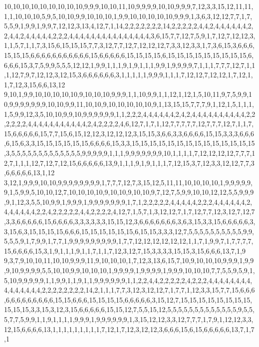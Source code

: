 10,10,10,10,10,10,10,10,10,9,9,9,10,10,11,10,9,9,9,9,10,10,9,9,9,7,12,3,3,15,12,11,11,1,1,10,10,10,5,9,5,10,10,9,9,10,10,10,1,9,9,10,10,10,10,10,9,9,9,1,3,6,3,12,12,7,7,1,7,5,5,9,1,9,9,1,9,9,7,12,12,3,13,4,12,7,1,14,2,2,2,2,2,2,2,14,2,2,2,2,2,4,4,2,4,4,4,4,4,4,2,2,4,4,2,4,4,4,4,4,2,2,2,4,4,4,4,4,4,4,4,4,4,4,4,4,4,4,3,6,15,7,7,12,7,5,9,1,7,12,7,12,12,3,1,1,5,7,1,1,7,3,15,6,15,15,15,7,7,3,12,7,7,12,7,12,12,12,7,3,3,12,3,3,1,7,3,6,15,3,6,6,6,15,15,15,6,6,6,6,6,6,6,6,6,6,6,15,6,6,6,6,6,15,15,15,15,6,15,15,15,15,15,15,15,15,15,6,6,6,6,15,3,7,5,9,9,5,5,5,12,12,1,9,9,1,1,1,9,1,9,1,1,1,9,9,1,9,9,9,9,7,1,1,1,7,7,7,12,7,1,1,1,12,7,9,7,12,12,3,12,15,3,6,6,6,6,6,6,3,1,1,1,1,1,9,9,9,1,1,1,7,12,12,7,12,12,1,7,12,1,1,7,12,3,15,6,6,13,12
9,10,1,9,9,10,10,10,10,10,9,10,10,10,9,9,9,1,1,10,9,9,1,1,12,1,12,1,5,10,11,9,7,5,9,9,10,9,9,9,9,9,9,9,10,10,9,9,11,10,10,9,10,10,10,10,10,9,1,13,15,15,7,7,7,9,1,12,1,5,1,1,1,1,5,9,9,12,3,5,10,10,9,9,10,9,9,9,9,9,9,1,1,2,2,2,4,4,4,4,4,4,2,4,2,4,4,4,4,4,4,4,4,4,4,2,2,2,2,2,2,4,4,4,4,4,4,4,4,4,4,4,2,4,2,2,2,2,4,6,12,7,1,7,1,12,7,7,7,7,7,12,7,7,7,12,7,1,1,7,15,6,6,6,6,6,15,7,7,15,6,15,12,12,3,12,12,12,3,15,15,3,6,6,3,3,6,6,6,6,15,15,3,3,3,6,6,6,6,15,6,3,3,15,15,15,15,15,15,6,6,6,6,15,3,3,15,15,15,15,15,15,15,15,15,15,15,15,15,15,3,5,5,5,5,5,5,5,5,5,5,5,5,5,9,9,9,9,9,1,1,1,9,9,9,9,9,9,9,10,1,1,1,1,7,12,12,12,12,7,7,7,12,7,1,1,1,12,7,12,7,12,15,6,6,6,6,6,13,9,1,1,1,9,1,9,1,1,1,7,12,15,3,7,12,3,3,12,12,7,7,3,6,6,6,6,6,13,1,12
3,12,1,9,9,9,10,10,9,9,9,9,9,9,9,9,1,7,7,7,12,7,3,15,12,5,11,11,10,10,10,10,1,9,9,9,9,9,9,1,5,9,9,5,10,10,12,7,10,10,10,10,9,10,10,9,10,10,9,7,12,7,5,9,9,10,10,12,12,5,5,9,9,9,9,1,12,3,5,5,10,9,9,1,9,9,9,1,9,9,9,9,9,9,9,1,7,1,2,2,2,2,2,4,4,4,4,4,2,2,2,4,4,4,4,4,4,2,4,4,4,4,4,4,2,2,4,2,2,2,2,2,4,4,2,2,2,2,4,12,7,1,5,7,1,3,12,12,7,1,7,12,7,7,12,3,12,7,12,7,3,3,6,6,6,6,6,15,6,6,6,6,3,3,3,3,3,3,15,15,12,3,6,6,6,6,6,6,6,3,6,3,15,3,3,15,6,6,6,6,6,3,3,15,6,3,15,15,15,15,6,6,6,15,15,15,15,15,15,6,15,15,3,3,3,12,7,5,5,5,5,5,5,5,5,5,5,9,9,5,5,5,9,1,7,9,9,1,7,7,1,9,9,9,9,9,9,9,9,9,1,7,7,12,12,12,12,12,12,1,1,7,1,9,9,7,1,7,7,7,7,15,6,6,6,6,15,3,1,9,1,1,1,9,1,1,7,1,1,7,12,3,12,7,15,3,3,3,3,15,15,3,15,6,6,6,13,7,1,9
9,3,7,9,10,10,11,10,10,9,9,9,11,9,10,10,10,1,7,12,3,13,6,15,7,10,9,10,10,10,9,9,9,1,9,9,9,10,9,9,9,9,5,5,10,10,9,9,10,10,10,1,9,9,9,9,1,9,9,9,9,1,9,9,9,10,10,10,7,7,5,5,9,5,9,1,5,10,9,9,9,9,9,1,1,9,9,1,1,9,1,1,9,9,9,9,9,9,1,1,2,2,4,4,2,2,2,2,2,4,2,2,2,4,4,4,4,4,4,4,4,4,4,4,4,4,4,4,2,2,2,2,2,2,2,2,14,2,1,1,1,7,7,3,12,3,12,12,7,1,7,7,1,12,3,3,15,7,7,15,6,6,6,6,6,6,6,6,6,6,6,6,15,15,6,6,6,15,15,15,15,6,6,6,6,6,3,15,12,7,15,15,15,15,15,15,15,15,15,15,15,3,3,15,3,12,3,15,6,6,6,6,6,15,15,12,7,5,5,15,12,5,5,5,5,5,5,5,5,5,5,5,5,5,9,5,5,5,7,7,5,9,9,1,1,9,1,1,1,1,9,9,9,1,9,9,9,9,9,9,1,3,15,12,12,3,3,12,7,7,7,1,7,9,1,12,12,3,3,12,15,6,6,6,6,13,1,1,1,1,1,1,1,1,1,7,12,1,7,12,3,12,12,3,6,6,6,15,6,15,6,6,6,6,6,13,7,1,7,1
